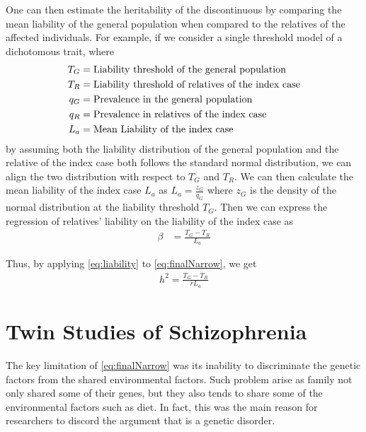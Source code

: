 	One can then estimate the heritability of the discontinuous by comparing the mean liability of the general population when compared to the relatives of the affected individuals.	
	For example, if we consider a single threshold model of a dichotomous trait, where 
	\begin{align}
	T_G &= \text{Liability threshold of the general population}\notag\\
	T_R &= \text{Liability threshold of relatives of the index case} \notag\\
	q_G &= \text{Prevalence in the general population}\notag\\
	q_R &= \text{Prevalence in relatives of the index case}\notag\\
	L_a &= \text{Mean Liability of the index case} \notag
	\end{align}
	by assuming both the liability distribution of the general population and the relative of the index case both follows the standard normal distribution, we can align the two distribution with respect to $T_G$ and $T_R$. 
	We can then calculate the mean liability of the index case $L_a$ as $L_a=\frac{z_G}{q_G}$ where $z_G$ is the density of the normal distribution at the liability threshold $T_G$.
	Then we can express the regression of relatives' liability on the liability of the index case as
	\begin{align}
	\beta &= \frac{T_G-T_R}{L_a}
	\label{eq:liability}
	\end{align}
	
	Thus, by applying \cref{eq:liability} to \cref{eq:finalNarrow}, we get
	\begin{align}
	h^2 =\frac{T_G-T_R}{rL_a}
	\end{align}
	
		
	\section{Twin Studies of Schizophrenia}
	The key limitation of \cref{eq:finalNarrow} was its inability to discriminate the genetic factors from the shared environmental factors.
	Such problem arise as family not only shared some of their genes, but they also tends to share some of the environmental factors such as diet. 
	In fact, this was the main reason for researchers to discord the argument that  is a genetic disorder.
	
